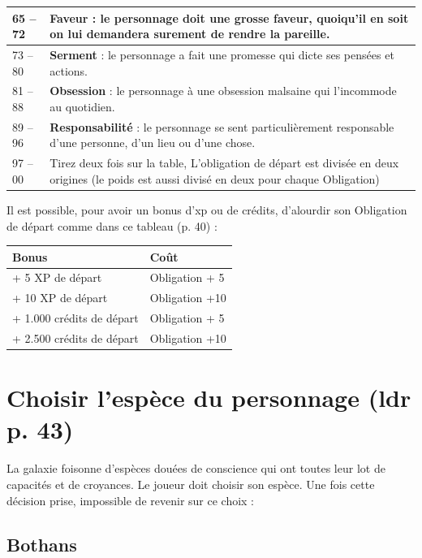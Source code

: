 \documentclass[twoside]{article}
\begin{document}
\begin{center}
\begin{tabular}{|p{4.5cm}|p{12cm}|}
		\hline 
		65 -- 72 & \textbf{Faveur} : le personnage doit une grosse faveur, quoiqu'il en soit on lui demandera surement de rendre la pareille. \\
		\hline 
		73 -- 80 & \textbf{Serment} : le personnage a fait une promesse qui dicte ses pensées et actions. \\
		\hline 
		81 -- 88 & \textbf{Obsession} : le personnage à une obsession malsaine qui l'incommode au quotidien. \\
		\hline 
		89 -- 96 & \textbf{Responsabilité} : le personnage se sent particulièrement responsable d'une personne, d'un lieu ou d'une chose. \\
		\hline 
		97 -- 00 & Tirez deux fois sur la table, L'obligation de départ est divisée en deux origines (le poids est aussi divisé en deux pour chaque Obligation) \\
		\hline 
	\end{tabular}
\end{center}

Il est possible, pour avoir un bonus d'xp ou de crédits, d'alourdir son Obligation de départ comme dans ce tableau (p. 40) :
\begin{center}
	\begin{tabular}{|p{4.5cm}|p{4cm}|}
		\hline 
		\cellcolor{DarkRed} {\large \textcolor{PureWhite}{\textbf{Bonus}}} & \cellcolor{DarkRed} {\large \textcolor{PureWhite}{\textbf{Coût}}} \\
		\hline 
		+ 5 XP de départ & Obligation + 5 \\
		\hline 
		+ 10 XP de départ & Obligation +10 \\
		\hline
		+ 1.000 crédits de départ & Obligation + 5 \\
		\hline
		+ 2.500 crédits de départ & Obligation +10 \\
		\hline
	\end{tabular}
\end{center}

\section{Choisir l'espèce du personnage (ldr p. 43)}
La galaxie foisonne d'espèces douées de conscience qui ont toutes leur lot de capacités et de croyances. Le joueur doit choisir son espèce. Une fois cette décision prise, impossible de revenir sur ce choix :

\subsection*{Bothans}
\end{document}
